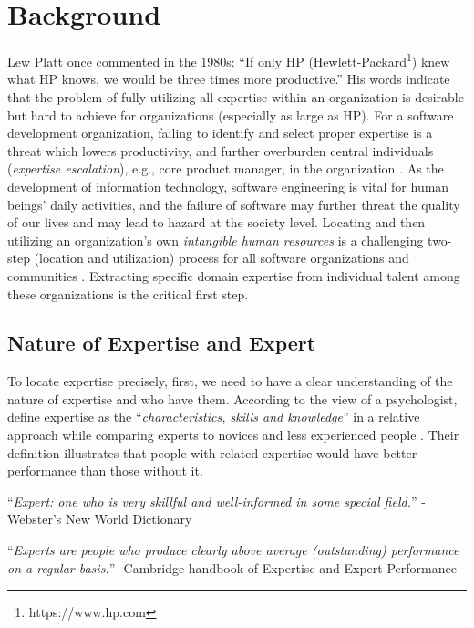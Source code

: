 \chapter{Background}

Lew Platt once commented in the 1980s: ``If only HP (Hewlett-Packard\footnote{https://www.hp.com}) knew what HP  knows, we would be three times more productive.'' His words indicate that the problem of fully utilizing all expertise within an organization is desirable but hard to achieve for organizations (especially as large as HP). For a software development organization, failing to identify and select proper expertise is a threat which lowers productivity, and further overburden central individuals (\textit{expertise escalation}), e.g., core product manager, in the organization \cite{mcdonald1998just}. As the development of information technology, software engineering is vital for human beings' daily activities, and the failure of software may further threat the quality of our lives and may lead to hazard at the society level. Locating and then utilizing an organization's own \textit{intangible human resources} is a challenging two-step (location and utilization) process for all software organizations and communities \cite{bohlander2010managing}. Extracting specific domain expertise from individual talent among these organizations is the critical first step.

\section{Nature of Expertise and Expert}

To locate expertise precisely, first, we need to have a clear understanding of the nature of expertise and who have them. According to the view of a psychologist, \citeauthor{ericsson2006cambridge} define expertise as the ``\textit{characteristics, skills and knowledge}'' in a relative approach while comparing experts to novices and less experienced people \cite{ericsson2006cambridge}. Their definition illustrates that people with related expertise would have better performance than those without it.

\begin{displayquote}
``\textit{Expert: one who is very skillful and well-informed in some special field.}'' -Webster's New World Dictionary

``\textit{Experts are people who produce clearly above average (outstanding) performance on a regular basis.}'' -Cambridge handbook of Expertise and Expert Performance
\end{displayquote}

